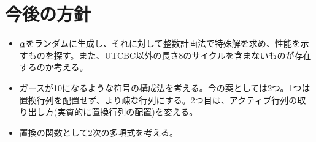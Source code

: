 \documentclass[a4paper,11pt,dvipdfmx]{jsarticle}
\theoremstyle{definition}
\begin{document}
\section{今後の方針}
\begin{itemize}
  \item $\underline{\bm{a}}$をランダムに生成し、それに対して整数計画法で特殊解を求め、性能を示すものを探す。また、UTCBC以外の長さ8のサイクルを含まないものが存在するのか考える。
  \item ガースが10になるような符号の構成法を考える。今の案としては2つ。1つは置換行列を配置せず、より疎な行列にする。2つ目は、アクティブ行列の取り出し方(実質的に置換行列の配置)を変える。
  \item 置換の関数として2次の多項式を考える。
\end{itemize}




\end{document}
